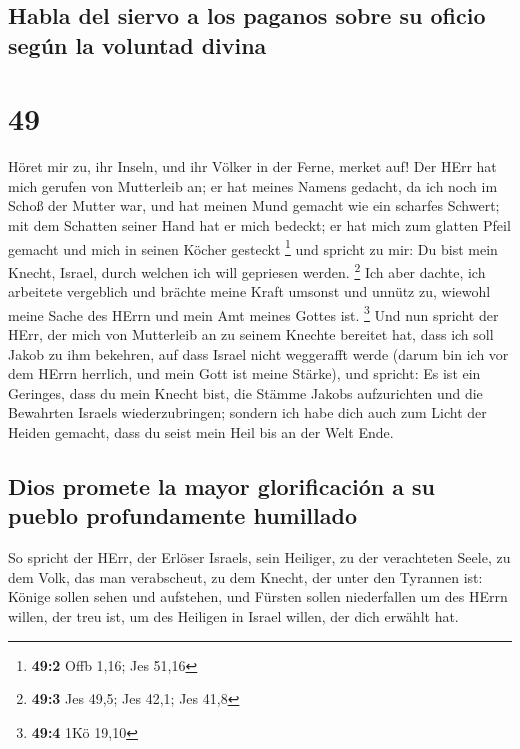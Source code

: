 \hypertarget{habla-del-siervo-a-los-paganos-sobre-su-oficio-seguxfan-la-voluntad-divina}{%
\subsection{Habla del siervo a los paganos sobre su oficio según la
voluntad
divina}\label{habla-del-siervo-a-los-paganos-sobre-su-oficio-seguxfan-la-voluntad-divina}}

\hypertarget{section-48}{%
\section{49}\label{section-48}}

 Höret mir zu, ihr Inseln, und ihr Völker in der Ferne,
merket auf! Der HErr hat mich gerufen von Mutterleib an; er hat meines
Namens gedacht, da ich noch im Schoß der Mutter war,  und
hat meinen Mund gemacht wie ein scharfes Schwert; mit dem Schatten
seiner Hand hat er mich bedeckt; er hat mich zum glatten Pfeil gemacht
und mich in seinen Köcher gesteckt \footnote{\textbf{49:2} Offb 1,16;
  Jes 51,16}  und spricht zu mir: Du bist mein Knecht,
Israel, durch welchen ich will gepriesen werden. \footnote{\textbf{49:3}
  Jes 49,5; Jes 42,1; Jes 41,8}  Ich aber dachte, ich
arbeitete vergeblich und brächte meine Kraft umsonst und unnütz zu,
wiewohl meine Sache des HErrn und mein Amt meines Gottes ist.
\footnote{\textbf{49:4} 1Kö 19,10}  Und nun spricht der
HErr, der mich von Mutterleib an zu seinem Knechte bereitet hat, dass
ich soll Jakob zu ihm bekehren, auf dass Israel nicht weggerafft werde
(darum bin ich vor dem HErrn herrlich, und mein Gott ist meine Stärke),
 und spricht: Es ist ein Geringes, dass du mein Knecht
bist, die Stämme Jakobs aufzurichten und die Bewahrten Israels
wiederzubringen; sondern ich habe dich auch zum Licht der Heiden
gemacht, dass du seist mein Heil bis an der Welt Ende.

\hypertarget{dios-promete-la-mayor-glorificaciuxf3n-a-su-pueblo-profundamente-humillado}{%
\subsection{Dios promete la mayor glorificación a su pueblo
profundamente
humillado}\label{dios-promete-la-mayor-glorificaciuxf3n-a-su-pueblo-profundamente-humillado}}

 So spricht der HErr, der Erlöser Israels, sein Heiliger,
zu der verachteten Seele, zu dem Volk, das man verabscheut, zu dem
Knecht, der unter den Tyrannen ist: Könige sollen sehen und aufstehen,
und Fürsten sollen niederfallen um des HErrn willen, der treu ist, um
des Heiligen in Israel willen, der dich erwählt hat.

